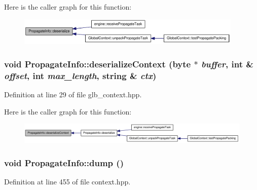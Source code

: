 Here is the caller graph for this function:\nopagebreak
\begin{figure}[H]
\begin{center}
\leavevmode
\includegraphics[width=305pt]{struct_propagate_info_a7dd786107e3f53d7b24d7482709a3347_icgraph}
\end{center}
\end{figure}
\hypertarget{struct_propagate_info_a8ae3a3e60a3ecec9a24e2d8ff3af8c57}{
\subsubsection[{deserializeContext}]{\setlength{\rightskip}{0pt plus 5cm}void PropagateInfo::deserializeContext ({\bf byte} $\ast$ {\em buffer}, \/  int \& {\em offset}, \/  int {\em max\_\-length}, \/  string \& {\em ctx})}}
\label{struct_propagate_info_a8ae3a3e60a3ecec9a24e2d8ff3af8c57}


Definition at line 29 of file glb\_\-context.hpp.

Here is the caller graph for this function:\nopagebreak
\begin{figure}[H]
\begin{center}
\leavevmode
\includegraphics[width=405pt]{struct_propagate_info_a8ae3a3e60a3ecec9a24e2d8ff3af8c57_icgraph}
\end{center}
\end{figure}
\hypertarget{struct_propagate_info_a87392639ebf09cbb6bb70edf7dc4c1aa}{
\subsubsection[{dump}]{\setlength{\rightskip}{0pt plus 5cm}void PropagateInfo::dump ()}}
\label{struct_propagate_info_a87392639ebf09cbb6bb70edf7dc4c1aa}


Definition at line 455 of file context.hpp.

